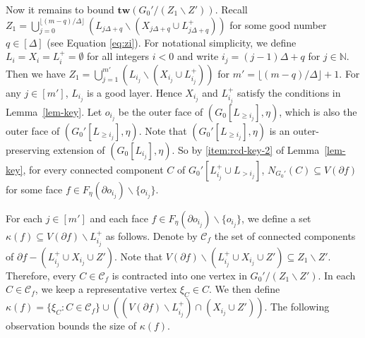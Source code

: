 \documentclass[a4paper,11pt]{article}
\numberwithin{lemma}{section}
\newcommand{\tw}{\mathbf{tw}}
\begin{document}
Now it remains to bound $\tw(G_0'/(Z_1 \backslash Z'))$.
Recall $Z_1 = \bigcup_{j=0}^{\lfloor(m-q)/\Delta\rfloor} (L_{j\Delta+q} \backslash (X_{j\Delta+q} \cup L_{j\Delta+q}^+))$ for some good number $q \in [\Delta]$ (see Equation \eqref{eq:zi}).
For notational simplicity, we define $L_i = X_i = L_i^+ = \emptyset$ for all integers $i < 0$ and write $i_j = (j-1) \Delta + q$ for $j \in \mathbb{N}$.
Then we have $Z_1 = \bigcup_{j=1}^{m'} (L_{i_j} \backslash (X_{i_j} \cup L_{i_j}^+))$ for $m' = \lfloor (m-q)/\Delta \rfloor + 1$.
For any $j \in [m']$, $L_{i_j}$ is a good layer.
Hence $X_{i_j}$ and $L_{i_j}^+$ satisfy the conditions in Lemma~\ref{lem-key}.
Let $o_{i_j}$ be the outer face of $(G_0[L_{\geq i_j}],\eta)$, which is also the outer face of $(G_0'[L_{\geq i_j}],\eta)$.
Note that $(G_0'[L_{\geq i_j}],\eta)$ is an outer-preserving extension of $(G_0[L_{i_j}],\eta)$.
So by \ref{item:rcd-key-2} of Lemma~\ref{lem-key}, for every connected component $C$ of $G_0'[L_{i_j}^+ \cup L_{> i_j}]$, $N_{G_0'}(C) \subseteq V(\partial f)$ for some face $f \in F_\eta(\partial o_{i_j}) \backslash \{o_{i_j}\}$.

For each $j \in [m']$ and each face $f \in F_\eta(\partial o_{i_j}) \backslash \{o_{i_j}\}$, we define a set $\kappa(f) \subseteq V(\partial f) \backslash L_{i_j}^+$ as follows.
Denote by $\mathcal{C}_f$ the set of connected components of $\partial f - (L_{i_j}^+ \cup X_{i_j} \cup Z')$.
Note that $V(\partial f) \backslash (L_{i_j}^+ \cup X_{i_j} \cup Z') \subseteq Z_1 \backslash Z'$.
Therefore, every $C \in \mathcal{C}_f$ is contracted into one vertex in $G_0'/(Z_1 \backslash Z')$.
In each $C \in \mathcal{C}_f$, we keep a representative vertex $\xi_C \in C$.
We then define $\kappa(f) = \{\xi_C: C \in \mathcal{C}_f\} \cup ((V(\partial f) \backslash L_{i_j}^+) \cap (X_{i_j} \cup Z'))$.
The following observation bounds the size of $\kappa(f)$.
\end{document}
